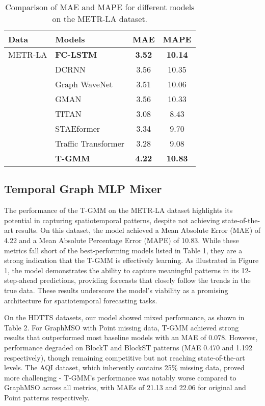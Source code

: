 \documentclass{article}
\theoremstyle{plain}
\theoremstyle{definition}
\theoremstyle{remark}
\begin{document}
\begin{table}[h!]
\centering
\begin{tabular}{@{}llcc@{}}
\toprule
\textbf{Data}    & \textbf{Models}        & \textbf{MAE} & \textbf{MAPE} \\ \midrule
METR-LA          & \textbf{FC-LSTM}      & \textbf{3.52} & \textbf{10.14} \\
                 & DCRNN                 & 3.56          & 10.35         \\
                 & Graph WaveNet         & 3.51          & 10.06         \\
                 & GMAN                  & 3.56          & 10.33         \\
                 & TITAN                 & 3.08          & 8.43          \\
                 & STAEformer            & 3.34          & 9.70          \\
                 & Traffic Transformer   & 3.28          & 9.08          \\
            & \textbf{T-GMM} & \textbf{4.22}  & \textbf{10.83} \\
                 \bottomrule
\end{tabular}
\caption{Comparison of MAE and MAPE for different models on the METR-LA dataset.}
\label{tab:metr_la_metrics}
\end{table}


\subsection{Temporal Graph MLP Mixer}


The performance of the T-GMM on the METR-LA dataset highlights its potential in capturing spatiotemporal patterns, despite not achieving state-of-the-art results. On this dataset, the model achieved a Mean Absolute Error (MAE) of 4.22 and a Mean Absolute Percentage Error (MAPE) of 10.83. While these metrics fall short of the best-performing models listed in Table 1, they are a strong indication that the T-GMM is effectively learning. As illustrated in Figure 1, the model demonstrates the ability to capture meaningful patterns in its 12-step-ahead predictions, providing forecasts that closely follow the trends in the true data. These results underscore the model's viability as a promising architecture for spatiotemporal forecasting tasks.

On the HDTTS datasets, our model showed mixed performance, as shown in Table 2. For GraphMSO with Point missing data, T-GMM achieved strong results that outperformed most baseline models with an MAE of 0.078. However, performance degraded on BlockT and BlockST patterns (MAE 0.470 and 1.192 respectively), though remaining competitive but not reaching state-of-the-art levels. The AQI dataset, which inherently contains 25\% missing data, proved more challenging - T-GMM's performance was notably worse compared to GraphMSO across all metrics, with MAEs of 21.13 and 22.06 for original and Point patterns respectively.
\end{document}
